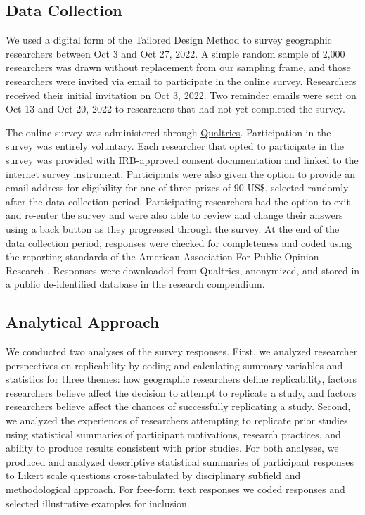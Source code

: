 \documentclass[]{interact}
\theoremstyle{plain}%
\theoremstyle{definition}
\theoremstyle{remark}
\begin{document}
\subsection*{Data Collection}
We used a digital form of the Tailored Design Method \citep{dillman2014internet} to survey geographic researchers between Oct 3 and Oct 27, 2022.
A simple random sample of 2,000 researchers was drawn without replacement from our sampling frame, and those researchers were invited via email to participate in the online survey. 
Researchers received their initial invitation on Oct 3, 2022. 
Two reminder emails were sent on Oct 13 and Oct 20, 2022 to researchers that had not yet completed the survey.

The online survey was administered through \href{https://www.qualtrics.com/}{Qualtrics}. 
Participation in the survey was entirely voluntary. 
Each researcher that opted to participate in the survey was provided with IRB-approved consent documentation and linked to the internet survey instrument. 
Participants were also given the option to provide an email address for eligibility for one of three  prizes of 90 US\$, selected randomly after the data collection period.
Participating researchers had the option to exit and re-enter the survey and were also able to review and change their answers using a back button as they progressed through the survey.
At the end of the data collection period, responses were checked for completeness and coded using the reporting standards of the American Association For Public Opinion Research \citep{aaporstandards}.
Responses were downloaded from Qualtrics, anonymized, and stored in a public de-identified database in the research compendium.

\subsection*{Analytical Approach}

We conducted two analyses of the survey responses.
First, we analyzed researcher perspectives on replicability by coding and calculating summary variables and statistics for three themes: how geographic researchers define replicability, factors researchers believe affect the decision to attempt to replicate a study, and factors researchers believe affect the chances of successfully replicating a study.
Second, we analyzed the experiences of researchers attempting to replicate prior studies using statistical summaries of participant motivations, research practices, and ability to produce results consistent with prior studies.
For both analyses, we produced and analyzed descriptive statistical summaries of participant responses to Likert scale questions cross-tabulated by disciplinary subfield and methodological approach.
For free-form text responses we coded responses and selected illustrative examples for inclusion. 
\end{document}
